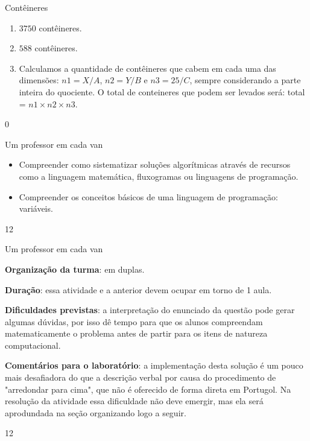 \begin{answer}{Contêineres}
{
\begin{enumerate}
\item $3750$ contêineres.

\item $588$ contêineres.

\item Calculamos a quantidade de contêineres que cabem em cada uma das dimensões: $n1=X/ A$, $n2=Y\slash B$ e $n3=25\slash C$, sempre considerando a parte inteira do quociente. O total de conteineres que podem ser levados será: total = $n1\times n2\times n3$.
\end{enumerate}
}{0}
\end{answer}
\begin{objectives}{Um professor em cada van}
{
\begin{itemize}
\item Compreender como sistematizar soluções algorítmicas através de recursos como a linguagem matemática, fluxogramas ou linguagens de programação.

\item Compreender os conceitos básicos de uma linguagem de programação: variáveis.
\end{itemize}
}{1}{2}
\end{objectives}
\begin{sugestions}{Um professor em cada van}
{
\textbf{Organização da turma}: em duplas.

\textbf{Duração}: essa atividade e a anterior devem ocupar em torno de 1 aula.

\textbf{Dificuldades previstas}: a interpretação do enunciado da questão pode gerar algumas dúvidas, por isso dê tempo para que os alunos compreendam matematicamente o problema antes de partir para os itens de natureza computacional.

\textbf{Comentários para o laboratório}: a implementação desta solução é um pouco mais desafiadora do que a descrição verbal por causa do procedimento de "arredondar para cima", que não é oferecido de forma direta em Portugol. Na resolução da atividade essa dificuldade não deve emergir, mas ela será aprodundada na seção organizando logo a seguir.
}{1}{2}
\end{sugestions}
